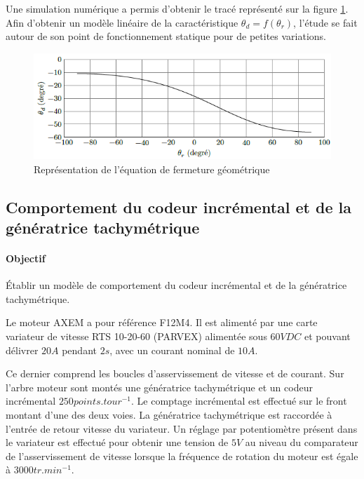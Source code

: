 \newpage

Une simulation numérique a permis d'obtenir le tracé représenté sur la figure \ref{fig9}. Afin d'obtenir un modèle linéaire de la caractéristique $\theta_d=f(\theta_r)$, l'étude se fait autour de son point de fonctionnement statique pour de petites variations.

\begin{figure}[!ht]
\begin{center}
 \includegraphics[width=0.7\linewidth]{img/img09}
\end{center}
\caption{Représentation de l'équation de fermeture géométrique}
\label{fig9}
\end{figure}



\subsection{Comportement du codeur incrémental et de la génératrice tachymétrique}

\paragraph{Objectif} Établir un modèle de comportement du codeur incrémental et de la génératrice tachymétrique.

Le moteur AXEM a pour référence F12M4. Il est alimenté par une carte variateur de vitesse RTS 10-20-60 (PARVEX) alimentée sous $60V DC$ et pouvant délivrer $20A$ pendant $2s$, avec un courant nominal de $10A$.

Ce dernier comprend les boucles d'asservissement de vitesse et de courant. Sur l'arbre moteur sont montés une génératrice tachymétrique et un codeur incrémental $250 points.tour^{-1}$. Le comptage incrémental est effectué sur le front montant d'une des deux voies. La génératrice tachymétrique est raccordée à l'entrée de retour vitesse du variateur. Un réglage par potentiomètre présent dans le variateur est effectué pour obtenir une tension de $5V$ au niveau du comparateur de l'asservissement de vitesse lorsque la fréquence de rotation du moteur est égale à $3000tr.min^{-1}$.

